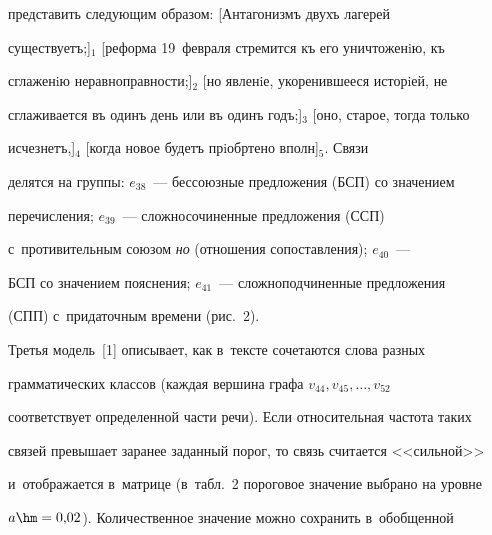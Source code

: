 представить следующим образом: [Антагонизмъ двухъ лагерей 


существуетъ;]$_1$ [реформа 19~февраля стремится къ его уничтоженiю, къ 


сглаженiю неравноправности;]$_2$ [но явленiе, укоренившееся исторiей, не 


сглаживается въ одинъ день или въ одинъ годъ;]$_3$ [оно, старое, тогда только 


исчезнетъ,]$_4$ [когда новое будетъ прiобр\hspace*{-2.5pt}тено вполн\hspace*{-2.5pt}]$_5$. Связи 


делятся на группы: $e_{38}$~--- бессоюзные предложения (БСП) со значением 


перечисления; $e_{39}$~--- сложносочиненные предложения (ССП) 


с~противительным союзом \textit{но} (отношения сопоставления); $e_{40}$~--- 


БСП со значением пояснения; $e_{41}$~--- сложноподчиненные предложения 


(СПП) с~придаточным времени (рис.~2).


    











    Третья модель~[1] описывает, как в~тексте сочетаются слова разных 


грамматических классов (каждая вершина графа $v_{44}, v_{45}, \ldots , v_{52}$ 


соответствует определенной части речи). Если относительная частота таких 


связей превышает заранее заданный порог, то связь считается <<сильной>> 


и~отображается в~матрице (в~табл.~2 пороговое значение выбрано на уровне 


$a\hm= 0{,}02$). Количественное значение можно сохранить в~обобщенной 


